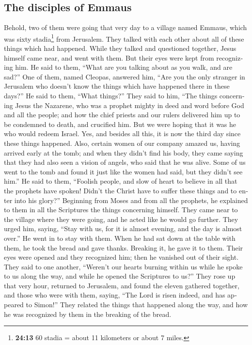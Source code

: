 \begin{paracol}{2}
\begin{otherlanguage}{english}
\begin{otherlanguage}{english}
\hypertarget{the-disciples-of-emmaus}{%
\subsection{The disciples of Emmaus}\label{the-disciples-of-emmaus}}

 Behold, two of them were going that very day to a
village named Emmaus, which was sixty stadia\footnote{\textbf{24:13} 60
  stadia = about 11 kilometers or about 7 miles.} from Jerusalem.
 They talked with each other about all of these things
which had happened.  While they talked and questioned
together, Jesus himself came near, and went with them. 
But their eyes were kept from recognizing him.  He said
to them, ``What are you talking about as you walk, and are sad?''
 One of them, named Cleopas, answered him, ``Are you the
only stranger in Jerusalem who doesn't know the things which have
happened there in these days?''  He said to them, ``What
things?'' They said to him, ``The things concerning Jesus the Nazarene,
who was a prophet mighty in deed and word before God and all the people;
 and how the chief priests and our rulers delivered him
up to be condemned to death, and crucified him.  But we
were hoping that it was he who would redeem Israel. Yes, and besides all
this, it is now the third day since these things happened.
 Also, certain women of our company amazed us, having
arrived early at the tomb;  and when they didn't find his
body, they came saying that they had also seen a vision of angels, who
said that he was alive.  Some of us went to the tomb and
found it just like the women had said, but they didn't see him.''
 He said to them, ``Foolish people, and slow of heart to
believe in all that the prophets have spoken!  Didn't the
Christ have to suffer these things and to enter into his glory?''
 Beginning from Moses and from all the prophets, he
explained to them in all the Scriptures the things concerning himself.
 They came near to the village where they were going, and
he acted like he would go further.  They urged him,
saying, ``Stay with us, for it is almost evening, and the day is almost
over.'' He went in to stay with them.  When he had sat
down at the table with them, he took the bread and gave thanks. Breaking
it, he gave it to them.  Their eyes were opened and they
recognized him; then he vanished out of their sight. 
They said to one another, ``Weren't our hearts burning within us while
he spoke to us along the way, and while he opened the Scriptures to
us?''  They rose up that very hour, returned to
Jerusalem, and found the eleven gathered together, and those who were
with them,  saying, ``The Lord is risen indeed, and has
appeared to Simon!''  They related the things that
happened along the way, and how he was recognized by them in the
breaking of the bread.


\end{otherlanguage}
\end{otherlanguage}
\end{paracol}
